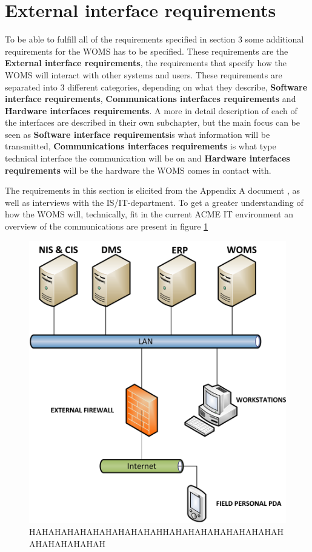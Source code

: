 \section{External interface requirements}
\label{sec:external_interface_requirements}

To be able to fulfill all of the requirements specified in section 3 some additional requirements for the WOMS has to be specified. These requirements are the \textbf{External interface requirements}, the requirements that specify how the WOMS will interact with other systems and users.  These requirements are separated into 3 different categories, depending on what they describe, \textbf{Software interface requirements}, \textbf{Communications interfaces requirements} and \textbf{Hardware interfaces requirements}. A more in detail description of each of the interfaces are described in their own subchapter, but the main focus can be seen as \textbf{Software interface requirements}is what information will be transmitted, \textbf{Communications interfaces requirements} is what type technical interface the communication will be on and \textbf{Hardware interfaces requirements} will be the hardware the WOMS comes in contact with. 

The requirements in this section is elicited from the Appendix A document \cite{}, as well as interviews with the IS/IT-department. To get a greater understanding of how the WOMS will, technically, fit in the current ACME IT environment an overview of the communications are present in figure \ref{fig:external_interfaces}


\begin{figure}[H]
	\centering
	\includegraphics[scale = 0.8]{images/external_interfaces.png}
	\caption{HAHAHAHAHAHAHAHAHAHAHHAHAHAHAHAHAHAHAHAHAHAHAHAHAHAH}
	\label{fig:external_interfaces}                      	
\end{figure}


